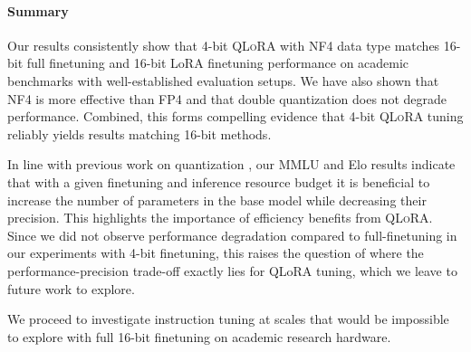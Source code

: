\paragraph{Summary} Our results consistently show that 4-bit \textsc{QLoRA} with NF4 data type matches 16-bit full finetuning and 16-bit LoRA finetuning performance on academic benchmarks with well-established evaluation setups. We have also shown that NF4 is more effective than FP4 and that double quantization does not degrade performance. Combined, this forms compelling evidence that 4-bit \textsc{QLoRA} tuning reliably yields results matching 16-bit methods. 

In line with previous work on quantization \citep{dettmers2022case}, our MMLU and Elo results indicate that with a given finetuning and inference resource budget it is beneficial to increase the number of parameters in the base model while decreasing their precision. This highlights the importance of efficiency benefits from \textsc{QLoRA}. Since we did not observe performance degradation compared to full-finetuning in our experiments with 4-bit finetuning, this raises the question of where the performance-precision trade-off exactly lies for QLoRA tuning, which we leave to future work to explore.

We proceed to investigate instruction tuning at scales that would be impossible to explore with full 16-bit finetuning on academic research hardware.

